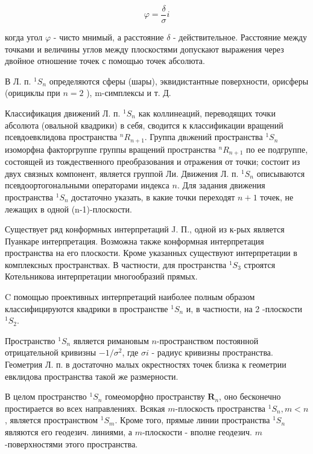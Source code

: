 \documentclass[10pt]{article}
\begin{document}
\[

\varphi=\frac{\delta}{\sigma} i

\]



когда угол $\varphi$ - чисто мнимый, а расстояние $\delta$ - действительное. Расстояние между точками и величины углов между плоскостями допускают выражения через двойное отношение точек с помощью точек абсолюта.



В Л. п. ${ }^{1} S_{n}$ определяются сферы (шары), эквидистантные поверхности, орисферы (орициклы при $n=2$ ), m-симплексы и т. Д.



Классификация движений Л. п. ${ }^{1} S_{n}$ как коллинеаций, переводящих точки абсолюта (овальной квадрики) в себя, сводится к классификации вращений псевдоевклидова пространства ${ }^{n} R_{n+1}$. Группа двıжений пространства ${ }^{1} S_{n}$ изоморфна факторгруппе группы вращений пространства ${ }^{n} R_{n+1}$ по ее подгруппе, состоящей из тождественного преобразования и отражения от точки; состоит из двух связных компонент, является группой Ли. Движения Л. п. ${ }^{1} S_{n}$ описываются псевдоортогональными операторами индекса $n$. Для задания движения пространства ${ }^{1} S_{n}$ достаточно указать, в какие точки переходят $n+1$ точек, не лежащих в одной (n-1)-плоскости.



Существует ряд конформных интерпретаций J. П., одной из к-рых является Пуанкаре интерпретация. Возможна также конформная интерпретация пространства на его плоскости. Кроме указанных существуют интерпретации в комплексных пространствах. В частности, для пространства ${ }^{1} S_{3}$ строятся Котельникова интерпретации многообразий прямых.



C помощью проективных интерпретаций наиболее полным образом классифицируются квадрики в пространстве ${ }^{1} S_{n}$ и, в частности, на 2 -плоскости ${ }^{1} S_{2}$.



Пространство ${ }^{1} S_{n}$ является римановым $n$-пространством постоянной отрицательной кривизны $-1 / \sigma^{2}$, где $\sigma i$ - радиус кривизны пространства. Геометрия Л. п. в достаточно малых окрестностях точек близка к геометрии евклидова пространства такой же размерности.



В целом пространство ${ }^{1} S_{n}$ гомеоморфно пространству $\boldsymbol{R}_{n}$, оно бесконечно простирается во всех направлениях. Всякая $m$-плоскость пространства ${ }^{1} S_{n}, m<n$, является пространством ${ }^{1} S_{m}$. Кроме того, прямые линии пространства ${ }^{1} S_{n}$ являются его геодезич. линиями, а $m$-плоскости - вполне геодезич. $m$-поверхностями этого пространства.
\end{document}

